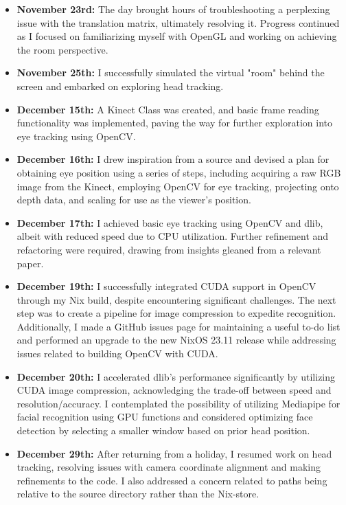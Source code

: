 \begin{itemize}
    \item \textbf{November 23rd:} The day brought hours of troubleshooting a perplexing issue with the translation matrix, ultimately resolving it. Progress continued as I focused on familiarizing myself with OpenGL and working on achieving the room perspective.

    \item \textbf{November 25th:} I successfully simulated the virtual "room" behind the screen and embarked on exploring head tracking.

    \item \textbf{December 15th:} A Kinect Class was created, and basic frame reading functionality was implemented, paving the way for further exploration into eye tracking using OpenCV.

    \item \textbf{December 16th:} I drew inspiration from a source \tocite and devised a plan for obtaining eye position using a series of steps, including acquiring a raw RGB image from the Kinect, employing OpenCV for eye tracking, projecting onto depth data, and scaling for use as the viewer's position.

    \item \textbf{December 17th:} I achieved basic eye tracking using OpenCV and dlib, albeit with reduced speed due to CPU utilization. Further refinement and refactoring were required, drawing from insights gleaned from a relevant paper.

    \item \textbf{December 19th:} I successfully integrated CUDA support in OpenCV through my Nix build, despite encountering significant challenges. The next step was to create a pipeline for image compression to expedite recognition. Additionally, I made a GitHub issues page for maintaining a useful to-do list and performed an upgrade to the new NixOS 23.11 release while addressing issues related to building OpenCV with CUDA.

    \item \textbf{December 20th:} I accelerated dlib's performance significantly by utilizing CUDA image compression, acknowledging the trade-off between speed and resolution/accuracy. I contemplated the possibility of utilizing Mediapipe for facial recognition using GPU functions and considered optimizing face detection by selecting a smaller window based on prior head position.

    \item \textbf{December 29th:} After returning from a holiday, I resumed work on head tracking, resolving issues with camera coordinate alignment and making refinements to the code. I also addressed a concern related to paths being relative to the source directory rather than the Nix-store.


\end{itemize}
